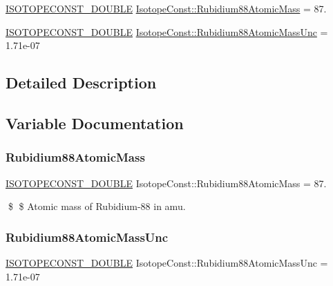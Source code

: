 \begin{DoxyCompactItemize}
\item 
\mbox{\hyperlink{group___isotope_const-_macros_ga8f45a7272ce02c0b4c65c44636ed719a}{I\+S\+O\+T\+O\+P\+E\+C\+O\+N\+S\+T\+\_\+\+D\+O\+U\+B\+LE}} \mbox{\hyperlink{group___isotope_const-_rubidium-_rb88_ga14d7f95aa93a3eb016055217b2a486b4}{Isotope\+Const\+::\+Rubidium88\+Atomic\+Mass}} = 87.
\item 
\mbox{\hyperlink{group___isotope_const-_macros_ga8f45a7272ce02c0b4c65c44636ed719a}{I\+S\+O\+T\+O\+P\+E\+C\+O\+N\+S\+T\+\_\+\+D\+O\+U\+B\+LE}} \mbox{\hyperlink{group___isotope_const-_rubidium-_rb88_ga3ff9ae6e1745aaf2137cbb5ee86c2bb1}{Isotope\+Const\+::\+Rubidium88\+Atomic\+Mass\+Unc}} = 1.\+71e-\/07
\end{DoxyCompactItemize}


\subsection{Detailed Description}


\subsection{Variable Documentation}
\mbox{\label{group___isotope_const-_rubidium-_rb88_ga14d7f95aa93a3eb016055217b2a486b4}} 
\subsubsection{\texorpdfstring{Rubidium88\+Atomic\+Mass}{Rubidium88AtomicMass}}
{\footnotesize\ttfamily \mbox{\hyperlink{group___isotope_const-_macros_ga8f45a7272ce02c0b4c65c44636ed719a}{I\+S\+O\+T\+O\+P\+E\+C\+O\+N\+S\+T\+\_\+\+D\+O\+U\+B\+LE}} Isotope\+Const\+::\+Rubidium88\+Atomic\+Mass = 87.}

\$ \$ Atomic mass of Rubidium-\/88 in amu. \mbox{\label{group___isotope_const-_rubidium-_rb88_ga3ff9ae6e1745aaf2137cbb5ee86c2bb1}} 
\subsubsection{\texorpdfstring{Rubidium88\+Atomic\+Mass\+Unc}{Rubidium88AtomicMassUnc}}
{\footnotesize\ttfamily \mbox{\hyperlink{group___isotope_const-_macros_ga8f45a7272ce02c0b4c65c44636ed719a}{I\+S\+O\+T\+O\+P\+E\+C\+O\+N\+S\+T\+\_\+\+D\+O\+U\+B\+LE}} Isotope\+Const\+::\+Rubidium88\+Atomic\+Mass\+Unc = 1.\+71e-\/07}

